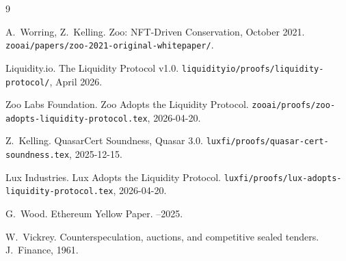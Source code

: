 \documentclass[11pt]{article}
\begin{document}
\begin{thebibliography}{9}

A.~Worring, Z.~Kelling.
\newblock Zoo: NFT-Driven Conservation, October 2021.
\newblock \texttt{zooai/papers/zoo-2021-original-whitepaper/}.

Liquidity.io.
\newblock The Liquidity Protocol v1.0.
\newblock \texttt{liquidityio/proofs/liquidity-protocol/}, April 2026.

Zoo Labs Foundation.
\newblock Zoo Adopts the Liquidity Protocol.
\newblock \texttt{zooai/proofs/zoo-adopts-liquidity-protocol.tex}, 2026-04-20.

Z.~Kelling.
\newblock QuasarCert Soundness, Quasar 3.0.
\newblock \texttt{luxfi/proofs/quasar-cert-soundness.tex}, 2025-12-15.

Lux Industries.
\newblock Lux Adopts the Liquidity Protocol.
\newblock \texttt{luxfi/proofs/lux-adopts-liquidity-protocol.tex}, 2026-04-20.

G.~Wood.
\newblock Ethereum Yellow Paper.
--2025.

W.~Vickrey.
\newblock Counterspeculation, auctions, and competitive sealed tenders.
\newblock J.\ Finance, 1961.

\end{thebibliography}
\end{document}
